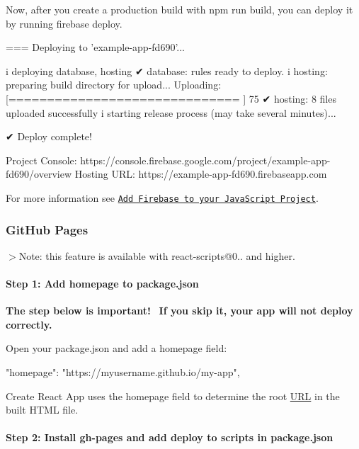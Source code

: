 Now, after you create a production build with {\ttfamily npm run build}, you can deploy it by running {\ttfamily firebase deploy}.


\begin{DoxyCode}
=== Deploying to 'example-app-fd690'...

i  deploying database, hosting
✔  database: rules ready to deploy.
i  hosting: preparing build directory for upload...
Uploading: [==============================          ] 75%
✔  hosting: 8 files uploaded successfully
i  starting release process (may take several minutes)...

✔  Deploy complete!

Project Console: https://console.firebase.google.com/project/example-app-fd690/overview
Hosting URL: https://example-app-fd690.firebaseapp.com
\end{DoxyCode}


For more information see \href{https://firebase.google.com/docs/web/setup}{\tt Add Firebase to your Java\+Script Project}.

\subsubsection*{Git\+Hub Pages}

$>$Note\+: this feature is available with {\ttfamily react-\/scripts@0..} and higher.

\paragraph*{Step 1\+: Add {\ttfamily homepage} to {\ttfamily package.\+json}}

{\bfseries The step below is important!}~\newline
 {\bfseries If you skip it, your app will not deploy correctly.}

Open your {\ttfamily package.\+json} and add a {\ttfamily homepage} field\+:


\begin{DoxyCode}
"homepage": "https://myusername.github.io/my-app",
\end{DoxyCode}


Create React App uses the {\ttfamily homepage} field to determine the root \mbox{\hyperlink{namespace_u_r_l}{U\+RL}} in the built H\+T\+ML file.

\paragraph*{Step 2\+: Install {\ttfamily gh-\/pages} and add {\ttfamily deploy} to {\ttfamily scripts} in {\ttfamily package.\+json}}

